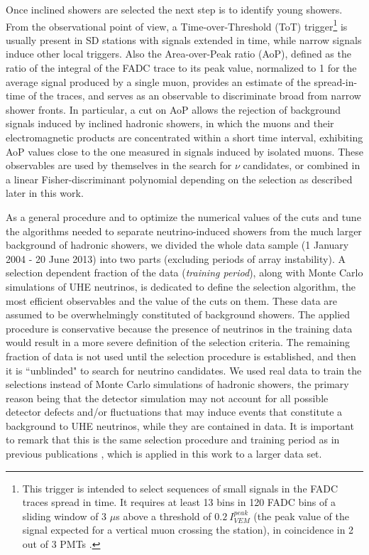 \documentclass[reprint,showpacs,showkeys,amsmath,amssymb,aps,nofootinbib]{revtex4-1}
\begin{document}
Once inclined showers are selected the next step is to identify young showers. 
From the observational point of view, a Time-over-Threshold (ToT) trigger\footnote{This trigger 
is intended to select sequences of small signals in the FADC traces spread in time.
It requires at least 13 bins in 120 FADC bins
of a sliding window of 3 $\mu$s above a
threshold of $0.2~I_{VEM}^{peak}$ (the peak value of the signal expected for a vertical
muon crossing the station), in coincidence in 2 out of 3 PMTs \cite{Auger_trigger}.} 
is usually present in SD stations with signals extended in time, 
while narrow signals induce other local triggers. 
Also the Area-over-Peak ratio (AoP), defined as
the ratio of the integral of the FADC trace to its peak value, 
normalized to 1 for the average signal produced by a single muon,
provides an estimate of the spread-in-time of the traces, 
and serves as an observable to discriminate broad
from narrow shower fronts. 
In particular, a cut on AoP allows the rejection of background signals induced by
inclined hadronic showers, in which the muons and their electromagnetic products
are concentrated within a short time interval, exhibiting AoP values close to the one
measured in signals induced by isolated muons. These observables are 
used by themselves in the search for $\nu$ candidates, or combined in a linear 
Fisher-discriminant polynomial depending on the
selection as described later in this work. 

As a general procedure and to optimize the numerical values of the cuts and tune 
the algorithms needed to separate neutrino-induced showers
from the much larger background of hadronic showers, we divided
the whole data sample (1 January 2004 - 20 June 2013) 
into two parts (excluding periods of array instability). 
A selection dependent fraction of the data ({\it training period}), 
along with Monte Carlo simulations of UHE neutrinos, is dedicated to define the selection algorithm,
the most efficient observables and the value of the cuts on them.
These data are assumed to be overwhelmingly constituted of background showers.
The applied procedure is conservative because the
presence of neutrinos in the training data would result in a more severe 
definition of the selection criteria.
The remaining fraction of data is not used until the selection procedure
is established, and then it is ``unblinded" to search for neutrino candidates. 
We used real data to train the selections instead of Monte Carlo simulations
of hadronic showers, 
the primary reason being that the detector simulation may not account 
for all possible detector defects and/or fluctuations that may induce 
events that constitute a background to UHE neutrinos, while they are
contained in data.
It is important to remark that this is the same selection procedure
and training period as in previous publications \cite{ES,DGH},
which is applied in this work to a larger data set.
\end{document}
